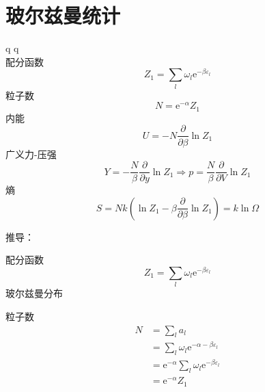 \section{玻尔兹曼统计}


q \quad {} \quad \dj q\\


配分函数
\begin{equation}
    Z_1=\sum_l{\omega _l\mathrm{e}^{-\beta \varepsilon _l}}
\end{equation}
粒子数
\begin{equation}
    N=\mathrm{e}^{-\alpha}Z_1
\end{equation}
内能
\begin{equation}
    U=-N\frac{\partial}{\partial \beta}\ln Z_1
\end{equation}
广义力-压强
\begin{equation}
    Y=-\frac{N}{\beta}\frac{\partial}{\partial y}\ln Z_1\Rightarrow p=\frac{N}{\beta}\frac{\partial}{\partial V}\ln Z_1
    
\end{equation}
熵
\begin{equation}
    S=Nk\left( \ln Z_1-\beta \frac{\partial}{\partial \beta}\ln Z_1 \right) =k\ln \Omega 
\end{equation}

推导：

配分函数
\begin{equation}
    Z_1=\sum_l{\omega _l\mathrm{e}^{-\beta \varepsilon _l}}
\end{equation}
玻尔兹曼分布
\begin{equation}
    
\end{equation}


粒子数
\begin{equation}
    \begin{aligned}
        N&=\sum_l{a_l}
\\
&=\sum_l{\omega _l\mathrm{e}^{-\alpha -\beta \varepsilon _l}}
\\
&=\mathrm{e}^{-\alpha}\sum_l{\omega _l\mathrm{e}^{-\beta \varepsilon _l}}
\\
&=\mathrm{e}^{-\alpha}Z_1
    \end{aligned}
\end{equation}


